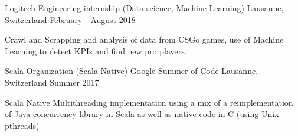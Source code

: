 \begin{cventries}
	
	
	
	\cventry
	{Logitech} %
	{Engineering internship (Data science, Machine Learning)} %
	{Lausanne, Switzerland} %
	{February - August 2018} %
	{ %
		\begin{cvitems}
			\item {Crawl and Scrapping and analysis of data from CSGo games, use of Machine Learning to detect KPIs and find new pro players.}
		\end{cvitems}
	}
	

	\cventry
	{Scala Organization (Scala Native)} %
	{Google Summer of Code} %
	{Lausanne, Switzerland} %
	{Summer 2017} %
	{ %
		\begin{cvitems}
			\item {Scala Native Multithreading implementation using a mix of a reimplementation of Java concurrency library in Scala as well as native code in C (using Unix pthreads)}
		\end{cvitems}
	}
	
	
	
	

\end{cventries}
